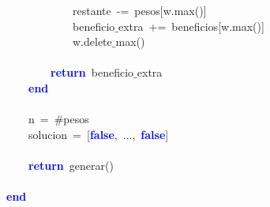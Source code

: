 \mbox{}\ \ \ \ \ \ \ \ \ \ \ \ restante\ \textcolor{BrickRed}{-=}\ pesos\textcolor{BrickRed}{[}w\textcolor{BrickRed}{.}max\textcolor{BrickRed}{()]} \\
\mbox{}\ \ \ \ \ \ \ \ \ \ \ \ beneficio$\_$extra\ \textcolor{BrickRed}{+=}\ beneficios\textcolor{BrickRed}{[}w\textcolor{BrickRed}{.}max\textcolor{BrickRed}{()]} \\
\mbox{}\ \ \ \ \ \ \ \ \ \ \ \ w\textcolor{BrickRed}{.}delete$\_$max\textcolor{BrickRed}{()} \\
\mbox{} \\
\mbox{}\ \ \ \ \ \ \ \ \textbf{\textcolor{Blue}{return}}\ beneficio$\_$extra \\
\mbox{}\ \ \ \ \textbf{\textcolor{Blue}{end}} \\
\mbox{} \\
\mbox{}\ \ \ \ n\ \textcolor{BrickRed}{=}\ \#pesos \\
\mbox{}\ \ \ \ solucion\ \textcolor{BrickRed}{=}\ \textcolor{BrickRed}{[}\textbf{\textcolor{Blue}{false}}\textcolor{BrickRed}{,}\ \textcolor{BrickRed}{...,}\ \textbf{\textcolor{Blue}{false}}\textcolor{BrickRed}{]} \\
\mbox{} \\
\mbox{}\ \ \ \ \textbf{\textcolor{Blue}{return}}\ generar\textcolor{BrickRed}{()} \\
\mbox{} \\
\mbox{}\textbf{\textcolor{Blue}{end}} \\
\mbox{}
